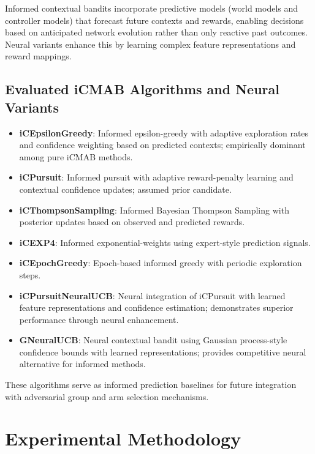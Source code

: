 \documentclass[12pt,a4paper]{article}
\begin{document}
Informed contextual bandits incorporate predictive models (world models and controller models) that forecast future contexts and rewards, enabling decisions based on anticipated network evolution rather than only reactive past outcomes. Neural variants enhance this by learning complex feature representations and reward mappings.

\subsection{Evaluated iCMAB Algorithms and Neural Variants}
\begin{itemize}
\item \textbf{iCEpsilonGreedy}: Informed epsilon-greedy with adaptive exploration rates and confidence weighting based on predicted contexts; empirically dominant among pure iCMAB methods.
\item \textbf{iCPursuit}: Informed pursuit with adaptive reward-penalty learning and contextual confidence updates; assumed prior candidate.
\item \textbf{iCThompsonSampling}: Informed Bayesian Thompson Sampling with posterior updates based on observed and predicted rewards.
\item \textbf{iCEXP4}: Informed exponential-weights using expert-style prediction signals.
\item \textbf{iCEpochGreedy}: Epoch-based informed greedy with periodic exploration steps.
\item \textbf{iCPursuitNeuralUCB}: Neural integration of iCPursuit with learned feature representations and confidence estimation; demonstrates superior performance through neural enhancement.
\item \textbf{GNeuralUCB}: Neural contextual bandit using Gaussian process-style confidence bounds with learned representations; provides competitive neural alternative for informed methods.
\end{itemize}

These algorithms serve as informed prediction baselines for future integration with adversarial group and arm selection mechanisms.

\section{Experimental Methodology}
\end{document}
